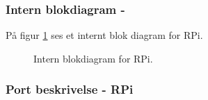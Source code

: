 \documentclass[Arkitektur/System_main.tex]{subfiles}
\begin{document}
\subsubsection{Intern blokdiagram - } \label{sec:rpi_hardware_ibd}


På figur \ref{fig:rpi_hardware_ibd} ses et internt blok diagram for RPi. 

\begin{figure}[H]
    \centering
    \caption{Intern blokdiagram for RPi.}
    \label{fig:rpi_hardware_ibd}
\end{figure}

\subsubsection{Port beskrivelse - RPi} \label{sec:RPi_hardware_ports}
\end{document}
